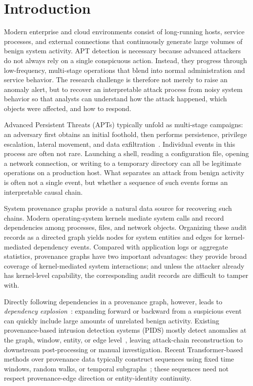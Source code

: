 \section{Introduction}
\label{sec:introduction}

Modern enterprise and cloud environments consist of long-running hosts, service processes, and external connections that continuously generate large volumes of benign system activity. APT detection is necessary because advanced attackers do not always rely on a single conspicuous action. Instead, they progress through low-frequency, multi-stage operations that blend into normal administration and service behavior. The research challenge is therefore not merely to raise an anomaly alert, but to recover an interpretable attack process from noisy system behavior so that analysts can understand how the attack happened, which objects were affected, and how to respond.

Advanced Persistent Threats (APTs) typically unfold as multi-stage campaigns: an adversary first obtains an initial foothold, then performs persistence, privilege escalation, lateral movement, and data exfiltration~\cite{mitreatt}. Individual events in this process are often not rare. Launching a shell, reading a configuration file, opening a network connection, or writing to a temporary directory can all be legitimate operations on a production host. What separates an attack from benign activity is often not a single event, but whether a sequence of such events forms an interpretable causal chain.

System provenance graphs provide a natural data source for recovering such chains. Modern operating-system kernels mediate system calls and record dependencies among processes, files, and network objects. Organizing these audit records as a directed graph yields nodes for system entities and edges for kernel-mediated dependency events. Compared with application logs or aggregate statistics, provenance graphs have two important advantages: they provide broad coverage of kernel-mediated system interactions; and unless the attacker already has kernel-level capability, the corresponding audit records are difficult to tamper with.

Directly following dependencies in a provenance graph, however, leads to \emph{dependency explosion}~\cite{kingbacktracking}: expanding forward or backward from a suspicious event can quickly include large amounts of unrelated benign activity. Existing provenance-based intrusion detection systems (PIDS) mostly detect anomalies at the graph, window, entity, or edge level~\cite{unicorn2020,yang2023prographer,cheng2024kairos,jia2024magic,wang2022threatrace,edgetrace2025}, leaving attack-chain reconstruction to downstream post-processing or manual investigation. Recent Transformer-based methods over provenance data typically construct sequences using fixed time windows, random walks, or temporal subgraphs~\cite{eagleeye2024,sentient2026,getaid2025}; these sequences need not respect provenance-edge direction or entity-identity continuity.

